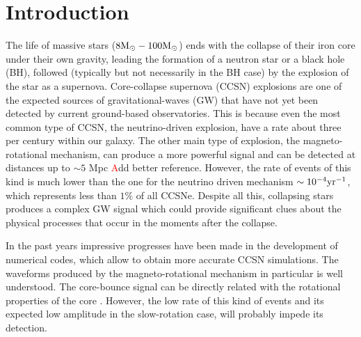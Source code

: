 \section{Introduction}


The life of massive stars ($8 {\rm M}_\odot-100{\rm M}_\odot$) ends with the collapse of their iron core under their own gravity, leading the formation of a neutron star or a black hole (BH), followed (typically but not necessarily in the BH case) by the explosion of the star as a supernova. Core-collapse supernova (CCSN) explosions are one of the expected sources of gravitational-waves (GW) that have not yet been detected by current ground-based observatories. This is because even the most common type of CCSN, the neutrino-driven explosion, have a rate about three per century \cite{Gossan:2016} within our galaxy. The other main type of explosion, the magneto-rotational mechanism, can produce a more powerful signal and can be detected at distances up to $\sim 5$ Mpc \cite{Gossan:2016} \textcolor{red} Add better reference. However, the rate of events of this kind is much lower than the one for the neutrino driven mechanism $\sim 10^{-4} \rm{yr}^{-1}$, which represents less than $1 \%$ of all CCSNe.
Despite all this, collapsing stars produces a complex GW signal which could provide significant clues about the physical processes that occur in the moments after the collapse. 

In the past years impressive progresses have been made in the development of numerical codes, which allow to obtain more accurate CCSN simulations. The waveforms produced by the magneto-rotational mechanism in particular is well understood. The core-bounce signal can be directly related with the rotational properties of the core \cite{Dimmelmeier:2007, abdikamalov:14, Richers:2017}. However, the low rate of this kind of events and its expected low amplitude in the slow-rotation case, will probably impede its detection.

